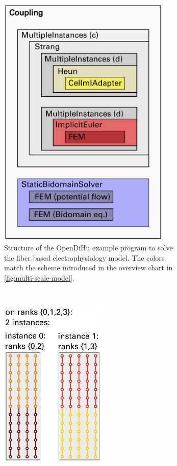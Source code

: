 \begin{figure}
\begin{subfigure}[t]{0.45\textwidth}
    \centering%
    \includegraphics[width=0.9\textwidth]{images/implementation/program_structure.pdf}
    \caption{Structure of the OpenDiHu example program to solve the fiber based electrophysiology model. The colors match the scheme introduced in the overview chart in \cref{fig:multi-scale-model}.}%
    \label{fig:program_structure}%
  \end{subfigure}
  \\[8mm]
  \begin{subfigure}[t]{0.48\textwidth}%
    \centering%
    \includegraphics[height=8cm]{images/implementation/fiber_partitioning1.pdf}

\end{subfigure}
\end{figure}
